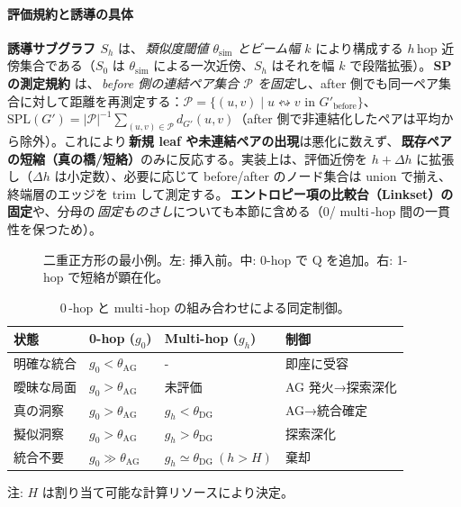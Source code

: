 \documentclass[ja=standard,xelatex]{bxjsarticle}
\begin{document}
\paragraph{評価規約と誘導の具体}
\textbf{誘導サブグラフ $S_h$} は、\,\emph{類似度閾値 $\theta_{\mathrm{sim}}$ とビーム幅 $k$} により構成する $h$\,hop 近傍集合である（$S_0$ は $\theta_{\mathrm{sim}}$ による一次近傍、$S_h$ はそれを幅 $k$ で段階拡張）。\,\textbf{SP の測定規約} は、\,\emph{before 側の連結ペア集合 $\mathcal{P}$ を固定}し、after 側でも同一ペア集合に対して距離を再測定する：$\mathcal{P}{=}\{(u,v)\mid u\leftrightsquigarrow v \text{ in } G'_{\text{before}}\}$、$\mathrm{SPL}(G'){=}|\mathcal{P}|^{-1}\sum_{(u,v)\in\mathcal{P}} d_{G'}(u,v)$（after 側で非連結化したペアは平均から除外）。これにより\,\textbf{新規 leaf や未連結ペアの出現}は悪化に数えず、\,\textbf{既存ペアの短縮（真の橋/短絡）}のみに反応する。実装上は、評価近傍を $h{+}\Delta h$ に拡張し（$\Delta h$ は小定数）、必要に応じて before/after のノード集合は union で揃え、終端層のエッジを trim して測定する。\,\textbf{エントロピー項の比較台（Linkset）の固定}や、分母の\,\emph{固定ものさし}についても本節に含める（0/ multi\,\mbox{-}hop 間の一貫性を保つため）。

\begin{figure}[H]
  \centering
  \vspace{0.6ex}
  \caption{二重正方形の最小例。左: 挿入前。中: 0-hop で Q を追加。右: 1-hop で短絡が顕在化。}
  \label{fig:minimal_example_b}
\end{figure}

\begin{table}[H]
\centering
\small
\caption{0\,\mbox{-}hop と multi\,\mbox{-}hop の組み合わせによる同定制御。}
\label{tab:graph_control_b}
\begin{tabular}{llll}
\toprule
状態 & 0-hop ($g_0$) & Multi-hop ($g_{h}$) & 制御 \\
\midrule
明確な統合 & $g_0<\theta_{\mathrm{AG}}$ & - & 即座に受容 \\
曖昧な局面 & $g_0>\theta_{\mathrm{AG}}$ & 未評価 & AG 発火→探索深化 \\
真の洞察 & $g_0>\theta_{\mathrm{AG}}$ & $g_h<\theta_{\mathrm{DG}}$ & AG→統合確定 \\
擬似洞察 & $g_0>\theta_{\mathrm{AG}}$ & $g_h>\theta_{\mathrm{DG}}$ & 探索深化 \\
統合不要 & $g_0\gg\theta_{\mathrm{AG}}$ & $g_h\simeq\theta_{\mathrm{DG}}\ (h>H)$ & 棄却 \\
\bottomrule
\end{tabular}
\vspace{0.4ex}\par\noindent\footnotesize{注: $H$ は割り当て可能な計算リソースにより決定。}\normalsize
\end{table}
\end{document}

